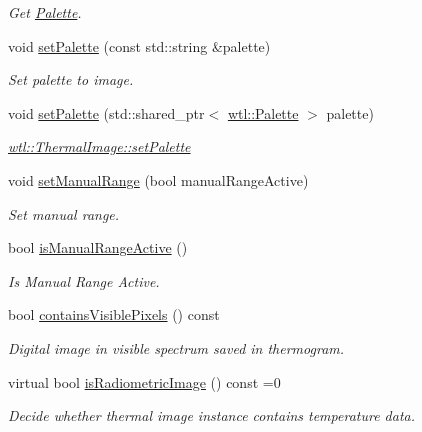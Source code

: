\begin{DoxyCompactItemize}
\begin{DoxyCompactList}\small\item\em Get \hyperlink{classwtl_1_1_palette}{Palette}. \end{DoxyCompactList}\item 
void \hyperlink{classwtl_1_1_thermal_image_a3c53fac4f759dfdbe3f73863449326b9}{set\+Palette} (const std\+::string \&palette)
\begin{DoxyCompactList}\small\item\em Set palette to image. \end{DoxyCompactList}\item 
void \hyperlink{classwtl_1_1_thermal_image_ac72bcde5f4b324f8a0a37322ac419c82}{set\+Palette} (std\+::shared\+\_\+ptr$<$ \hyperlink{classwtl_1_1_palette}{wtl\+::\+Palette} $>$ palette)
\begin{DoxyCompactList}\small\item\em \hyperlink{classwtl_1_1_thermal_image_a3c53fac4f759dfdbe3f73863449326b9}{wtl\+::\+Thermal\+Image\+::set\+Palette} \end{DoxyCompactList}\item 
void \hyperlink{classwtl_1_1_thermal_image_aefc6b816aff2637cffb7db3ea359a365}{set\+Manual\+Range} (bool manual\+Range\+Active)
\begin{DoxyCompactList}\small\item\em Set manual range. \end{DoxyCompactList}\item 
bool \hyperlink{classwtl_1_1_thermal_image_a393678afe9b5347070219d56777546d3}{is\+Manual\+Range\+Active} ()
\begin{DoxyCompactList}\small\item\em Is Manual Range Active. \end{DoxyCompactList}\item 
bool \hyperlink{classwtl_1_1_thermal_image_aad0c616dfafb769050f434c92b50f1e7}{contains\+Visible\+Pixels} () const
\begin{DoxyCompactList}\small\item\em Digital image in visible spectrum saved in thermogram. \end{DoxyCompactList}\item 
virtual bool \hyperlink{classwtl_1_1_thermal_image_a6414e809f033c1813ac6801afcfb84b5}{is\+Radiometric\+Image} () const =0
\begin{DoxyCompactList}\small\item\em Decide whether thermal image instance contains temperature data. \end{DoxyCompactList}\item 

\end{DoxyCompactItemize}
